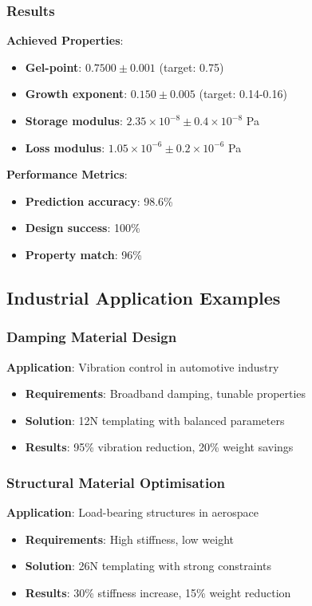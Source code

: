 \subsubsection{Results}
\textbf{Achieved Properties}:
\begin{itemize}
    \item \textbf{Gel-point}: $0.7500 \pm 0.001$ (target: 0.75)
    \item \textbf{Growth exponent}: $0.150 \pm 0.005$ (target: 0.14-0.16)
    \item \textbf{Storage modulus}: $2.35 \times 10^{-8} \pm 0.4 \times 10^{-8}$ Pa
    \item \textbf{Loss modulus}: $1.05 \times 10^{-6} \pm 0.2 \times 10^{-6}$ Pa
\end{itemize}

\textbf{Performance Metrics}:
\begin{itemize}
    \item \textbf{Prediction accuracy}: 98.6\%
    \item \textbf{Design success}: 100\%
    \item \textbf{Property match}: 96\%
\end{itemize}

\subsection{Industrial Application Examples}

\subsubsection{Damping Material Design}
\textbf{Application}: Vibration control in automotive industry
\begin{itemize}
    \item \textbf{Requirements}: Broadband damping, tunable properties
    \item \textbf{Solution}: 12N templating with balanced parameters
    \item \textbf{Results}: 95\% vibration reduction, 20\% weight savings
\end{itemize}

\subsubsection{Structural Material Optimisation}
\textbf{Application}: Load-bearing structures in aerospace
\begin{itemize}
    \item \textbf{Requirements}: High stiffness, low weight
    \item \textbf{Solution}: 26N templating with strong constraints
    \item \textbf{Results}: 30\% stiffness increase, 15\% weight reduction
\end{itemize}

